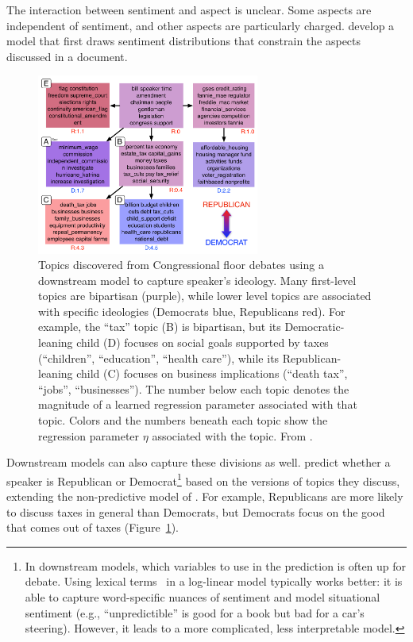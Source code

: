 The interaction between sentiment and aspect is unclear.  Some
aspects are independent of sentiment, and other aspects are
particularly charged.  \citet{jo-11} develop a model that first draws
sentiment distributions that constrain the aspects discussed in a
document.


\begin{figure}[t]
\begin{center}
    \includegraphics[width=0.65\textwidth]{figures/ideology_topics_vert}
\end{center}
    \caption{
       \small Topics discovered from Congressional floor debates using
       a downstream model to capture speaker's ideology.  Many
    first-level topics are bipartisan (purple), while lower level topics are
    associated with specific ideologies (Democrats blue, Republicans red). For example,
    	the ``tax'' topic (B) is bipartisan, but its Democratic-leaning child (D) focuses on
    	social goals supported by taxes (``children'', ``education'', ``health care''), while
    	its Republican-leaning child (C) focuses on business implications (``death tax'', ``jobs'',
    	``businesses'').  The number below each
    topic denotes the magnitude of a learned regression parameter associated
    with that topic.  Colors and the numbers beneath each topic show the
    regression parameter $\eta$ associated with the topic.  From \citet{nguyen-13:shlda}.
    } \label{fig:shlda-taxes}
\end{figure}

Downstream models can also capture these divisions as well.
\citet{nguyen-13:shlda} predict whether a speaker is Republican or
Democrat\footnote{In downstream models, which variables to use in the
  prediction is often up for debate.  Using lexical
  terms~\citep{titov-08,zhao-10} in a log-linear model typically works
  better: it is able to capture word-specific nuances of sentiment and
  model situational sentiment (e.g., ``unpredictible'' is good for a
  book but bad for a car's steering).  However, it leads to a more
  complicated, less interpretable model.} based on the versions of
topics they discuss, extending the non-predictive model of
\citet{grimmer-09}.  For example, Republicans are more likely to
discuss taxes in general than Democrats, but Democrats focus on the
good that comes out of taxes (Figure~\ref{fig:shlda-taxes}).

